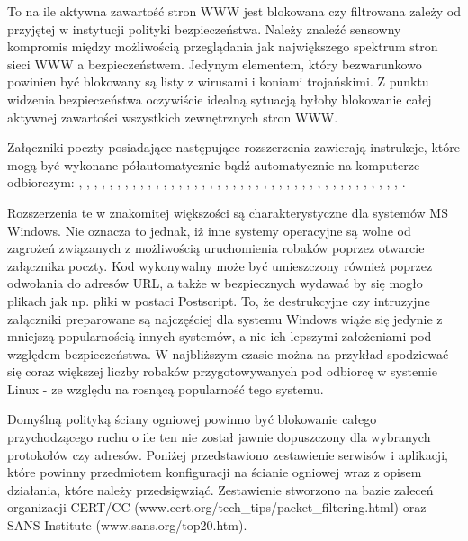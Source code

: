 To na ile aktywna zawartość stron WWW jest blokowana czy filtrowana zależy
od przyjętej w instytucji polityki bezpieczeństwa. Należy znaleźć sensowny
kompromis między możliwością przeglądania jak największego spektrum stron
sieci WWW a bezpieczeństwem. Jedynym elementem, który bezwarunkowo powinien
być blokowany są listy z wirusami i koniami trojańskimi. Z punktu widzenia
bezpieczeństwa oczywiście idealną sytuacją byłoby blokowanie całej aktywnej
zawartości wszystkich zewnętrznych stron WWW.

Załączniki poczty posiadające następujące rozszerzenia zawierają instrukcje,
które mogą być wykonane półautomatycznie bądź automatycznie na komputerze
odbiorczym:
,
,
,
,
,
,
,
,
,
,
,
,
,
,
,
,
,
,
,
,
,
,
,
,
,
,
,
,
,
,
,
,
,
,
,
,
,
,
,
,
,
,
.

Rozszerzenia te w znakomitej większości są charakterystyczne dla systemów MS
Windows. Nie oznacza to jednak, iż inne systemy operacyjne są wolne od
zagrożeń związanych z możliwością uruchomienia robaków poprzez otwarcie
załącznika poczty. Kod wykonywalny może być umieszczony również poprzez
odwołania do adresów URL, a także w bezpiecznych wydawać by się mogło
plikach jak np. pliki w postaci Postscript. To, że destrukcyjne czy
intruzyjne załączniki preparowane są najczęściej dla systemu Windows wiąże
się jedynie z mniejszą popularnością innych systemów, a nie ich lepszymi
założeniami pod względem bezpieczeństwa. W najbliższym czasie można na
przykład spodziewać się coraz większej liczby robaków przygotowywanych pod
odbiorcę w systemie Linux - ze względu na rosnącą popularność tego systemu.

Domyślną polityką ściany ogniowej powinno być blokowanie całego
przychodzącego ruchu o ile ten nie został jawnie dopuszczony dla wybranych
protokołów czy adresów. Poniżej przedstawiono zestawienie serwisów i
aplikacji, które powinny przedmiotem konfiguracji na ścianie ogniowej wraz z
opisem działania, które należy przedsięwziąć. Zestawienie stworzono na bazie
zaleceń organizacji CERT/CC (www.cert.org/tech\_tips/packet\_filtering.html)
oraz SANS Institute (www.sans.org/top20.htm).

